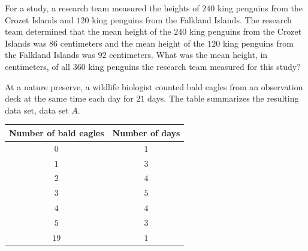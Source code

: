 \vspace{0.75em}


\vspace{2em}
\newpage

\noindent\markforreview
\vspace{1em}

For a study, a research team measured the heights of \(240\) king penguins from the Crozet Islands and \(120\) king penguins from the Falkland Islands.
The research team determined that the mean height of the \(240\) king penguins from the Crozet Islands was \(86\) centimeters and the mean height of the \(120\) king penguins from the Falkland Islands was \(92\) centimeters.
What was the mean height, in centimeters, of all \(360\) king penguins the research team measured for this study?

\vspace{0.75em}


\vspace{2em}
\newpage

\noindent\markforreview
\vspace{1em}

At a nature preserve, a wildlife biologist counted bald eagles from an observation deck at the same time each day for \(21\) days.
The table summarizes the resulting data set, data set \(A\).

\begin{center}
\begin{tabular}{|c|c|}
\hline
Number of bald eagles & Number of days \\
\hline
\(0\) & \(1\) \\
\(1\) & \(3\) \\
\(2\) & \(4\) \\
\(3\) & \(5\) \\
\(4\) & \(4\) \\
\(5\) & \(3\) \\
\(19\) & \(1\) \\
\hline
\end{tabular}
\end{center}

